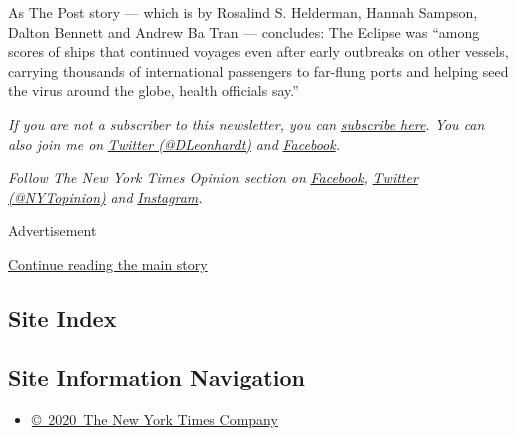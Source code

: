 As The Post story --- which is by Rosalind S. Helderman, Hannah Sampson,
Dalton Bennett and Andrew Ba Tran --- concludes: The Eclipse was ``among
scores of ships that continued voyages even after early outbreaks on
other vessels, carrying thousands of international passengers to
far-flung ports and helping seed the virus around the globe, health
officials say.''

\emph{If you are not a subscriber to this newsletter, you can}
\href{https://www.nytimes3xbfgragh.onion/newsletters/david-leonhardt}{\emph{subscribe
here}}\emph{. You can also join me on}
\href{https://twitter.com/DLeonhardt}{\emph{Twitter (@DLeonhardt)}}
\emph{and}
\href{https://www.facebookcorewwwi.onion/DavidRLeonhardt/}{\emph{Facebook}}\emph{.}

\emph{Follow The New York Times Opinion section on}
\href{https://www.facebookcorewwwi.onion/nytopinion}{\emph{Facebook}}\emph{,}
\href{http://twitter.com/NYTOpinion}{\emph{Twitter (@NYTopinion)}}
\emph{and}
\href{https://www.instagram.com/nytopinion/}{\emph{Instagram}}\emph{.}

Advertisement

\protect\hyperlink{after-bottom}{Continue reading the main story}

\hypertarget{site-index}{%
\subsection{Site Index}\label{site-index}}

\hypertarget{site-information-navigation}{%
\subsection{Site Information
Navigation}\label{site-information-navigation}}

\begin{itemize}
\tightlist
\item
  \href{https://help.nytimes3xbfgragh.onion/hc/en-us/articles/115014792127-Copyright-notice}{©~2020~The
  New York Times Company}
\end{itemize}

